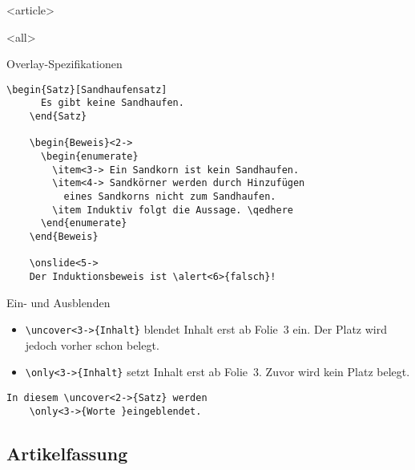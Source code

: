 \mode
<article>

\frame{}

\mode
<all>

\begin{Frame}[fragile]{Overlay-Spezifikationen}
  \begin{lstlisting}[gobble=4]
    \begin{Satz}[Sandhaufensatz]
      Es gibt keine Sandhaufen.
    \end{Satz}

    \begin{Beweis}<2->
      \begin{enumerate}
        \item<3-> Ein Sandkorn ist kein Sandhaufen.
        \item<4-> Sandkörner werden durch Hinzufügen
          eines Sandkorns nicht zum Sandhaufen.
        \item Induktiv folgt die Aussage. \qedhere
      \end{enumerate}
    \end{Beweis}

    \onslide<5->
    Der Induktionsbeweis ist \alert<6>{falsch}!
  \end{lstlisting}
\end{Frame}

\begin{Frame}[fragile]{Ein- und Ausblenden}
  \begin{itemize}
    \item \lstinline|\uncover<3->{Inhalt}| blendet Inhalt erst ab
      Folie~3 ein. Der Platz wird jedoch vorher schon belegt.
    \item \lstinline|\only<3->{Inhalt}| setzt Inhalt erst ab Folie~3.
      Zuvor wird kein Platz belegt.
  \end{itemize}

  \xxx
  \pause

  \begin{lstlisting}[gobble=4]
    In diesem \uncover<2->{Satz} werden
    \only<3->{Worte }eingeblendet.
  \end{lstlisting}
\end{Frame}

\subsection{Artikelfassung}


